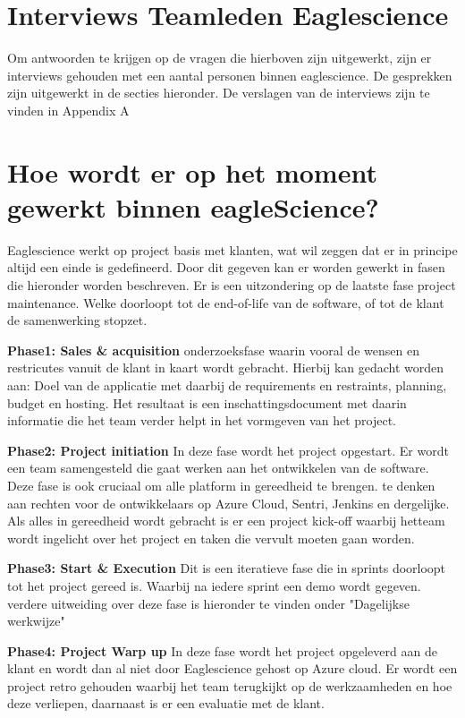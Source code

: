 \section{Interviews Teamleden Eaglescience}
Om antwoorden te krijgen op de vragen die hierboven zijn uitgewerkt, zijn er interviews gehouden met een aantal personen binnen eaglescience. De gesprekken zijn uitgewerkt in de secties hieronder. De verslagen van de interviews zijn te vinden in Appendix A

\section{Hoe wordt er op het moment gewerkt binnen eagleScience?}
Eaglescience werkt op project basis met klanten, wat wil zeggen dat er in principe altijd een einde is gedefineerd. Door dit gegeven kan er worden gewerkt in fasen die hieronder worden beschreven. Er is een uitzondering op de laatste fase project maintenance. Welke doorloopt tot de end-of-life van de software, of tot de klant de samenwerking stopzet.

\textbf{Phase1: Sales \& acquisition}
onderzoeksfase waarin vooral de wensen en restricutes vanuit de klant in kaart wordt gebracht. Hierbij kan gedacht worden aan: Doel van de applicatie met daarbij de requirements en restraints, planning, budget en hosting. Het resultaat is een inschattingsdocument met daarin informatie die het team verder helpt in het vormgeven van het project.

\textbf{Phase2: Project initiation}
In deze fase wordt het project opgestart. Er wordt een team samengesteld die gaat werken aan het ontwikkelen van de software. Deze fase is ook cruciaal om alle platform in gereedheid te brengen. te denken aan rechten voor de ontwikkelaars op Azure Cloud, Sentri, Jenkins en dergelijke. Als alles in gereedheid wordt gebracht is er een project kick-off waarbij hetteam wordt ingelicht over het project en taken die vervult moeten gaan worden.

\textbf{Phase3: Start \& Execution}
Dit is een iteratieve fase die in sprints doorloopt tot het project gereed is. Waarbij na iedere sprint een demo wordt gegeven. verdere uitweiding over deze fase is hieronder te vinden onder "Dagelijkse werkwijze"

\textbf{Phase4: Project Warp up}
In deze fase wordt het project opgeleverd aan de klant en wordt dan al niet door Eaglescience gehost op Azure cloud. Er wordt een project retro gehouden waarbij het team terugkijkt op de werkzaamheden en hoe deze verliepen, daarnaast is er een evaluatie met de klant.


